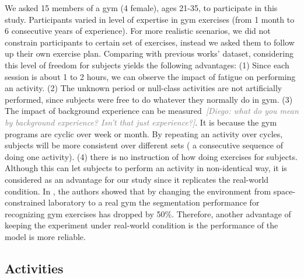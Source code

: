 \documentclass[journal,article,submit,moreauthors,pdftex]{Definitions/mdpi}
\newcommand{\diego}[1]{\textcolor{gray}{{\it [Diego: #1]}}}
\begin{document}
We asked 15 members of a gym (4 female), ages 21-35, to participate in this study. Participants varied in level of expertise in gym exercises (from 1 month to 6 consecutive years of experience). For more realistic scenarios, we did not constrain participants to certain set of exercises, instead we asked them to follow up their own exercise plan. Comparing with previous works' dataset, considering this level of freedom for subjects yields the following advantages: (1) Since each session is about 1 to 2 hours, we can observe the impact of fatigue on performing an activity. (2) The unknown period or null-class activities are not artificially performed, since subjects were free to do whatever they normally do in gym. (3) The impact of background experience can be measured~\diego{what do you mean by background experience? Isn't that just experience?}. It is because the gym programs are cyclic over week or month. By repeating an activity over cycles, subjects will be more consistent over different sets ( a consecutive sequence of doing one activity). (4) there is no instruction of how doing exercises for subjects. Although this can let subjects to perform an activity in non-identical way, it is considered as an advantage for our study since it replicates the real-world condition. In \cite{morris2014recofit}, the authors showed that by changing the environment from space-constrained laboratory to a real gym the segmentation performance for recognizing gym exercises has dropped by 50\%. Therefore, another advantage of keeping the experiment under real-world condition is the performance of the model is more reliable.\\

\subsection{Activities}
\end{document}
